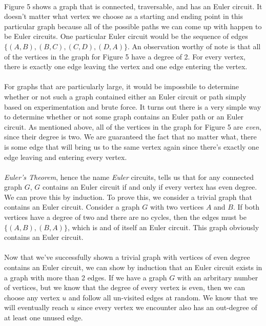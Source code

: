 \documentclass{article}
\begin{document}
\paragraph{}
Figure 5 shows a graph that is connected, traversable, and has an Euler circuit. It doesn't matter what vertex we choose as a starting and ending point in this particular graph because all of the possible paths we can come up with happen to be Euler circuits. One particular Euler circuit would be the sequence of edges $\{(A,B),(B,C),(C,D),(D,A)\}$. An observation worthy of note is that all of the vertices in the graph for Figure 5 have a degree of 2. For every vertex, there is exactly one edge leaving the vertex and one edge entering the vertex.

\paragraph{}
For graphs that are particularly large, it would be impossbile to determine whether or not such a graph contained either an Euler circuit or path simply based on experimentation and brute force. It turns out there is a very simple way to determine whether or not some graph contains an Euler path or an Euler circuit. As mentioned above, all of the vertices in the graph for Figure 5 are \textit{even}, since their degree is two. We are guaranteed the fact that no matter what, there is some edge that will bring us to the same vertex again since there's exactly one edge leaving and entering every vertex.

\paragraph{}
\textit{Euler's Theorem}, hence the name \textit{Euler} circuits, tells us that for any connected graph $G$, $G$ contains an Euler circuit if and only if every vertex has even degree. We can prove this by induction. To prove this, we consider a trivial graph that contains an Euler circuit. Consider a graph $G$ with two vertices $A$ and $B$. If both vertices have a degree of two and there are no cycles, then the edges must be $\{(A,B), (B,A)\}$, which is and of itself an Euler circuit. This graph obviously contains an Euler circuit.

\paragraph{}
Now that we've successfully shown a trivial graph with vertices of even degree contains an Euler circuit, we can show by induction that an Euler circuit exists in a graph with more than 2 edges. If we have a graph $G$ with an arbritary number of vertices, but we know that the degree of every vertex is even, then we can choose any vertex $u$ and follow all un-visited edges at random. We know that we will eventually reach $u$ since every vertex we encounter also has an out-degree of at least one unused edge.
\end{document}
